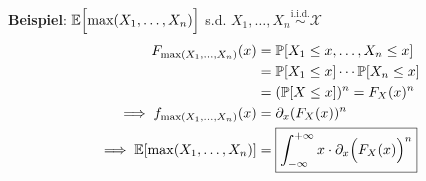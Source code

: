 {\scriptsize
    \textbf{Beispiel}: $\mathbb{E}\Bigl[\text{max}(X_1,\ldots,X_n)\Bigr]$ s.d. $X_1,\ldots,X_n \overset{\text{i.i.d.}}{\sim} \mathcal{X}$
    \begin{align*}
        F_{\max(X_1,\ldots,X_n)}(x)             &= \mathbb{P}[X_1\leq x,\ldots,X_n\leq x]           \\
                                                &= \mathbb{P}[X_1\leq x] \cdots \mathbb{P}[X_n\leq x]       \\
                                                &= (\mathbb{P}[X \leq x])^n = F_X(x)^n              \\
        \implies f_{\max(X_1,\ldots,X_n)}(x)    &= \partial_x (F_X(x))^n                    \\
        \implies \mathbb{E}[\max(X_1,\ldots,X_n)]       &= \boxed{\int_{-\infty}^{+\infty} x \cdot \partial_x \Bigl(F_X(x)\Bigr)^n}
    \end{align*}

}
